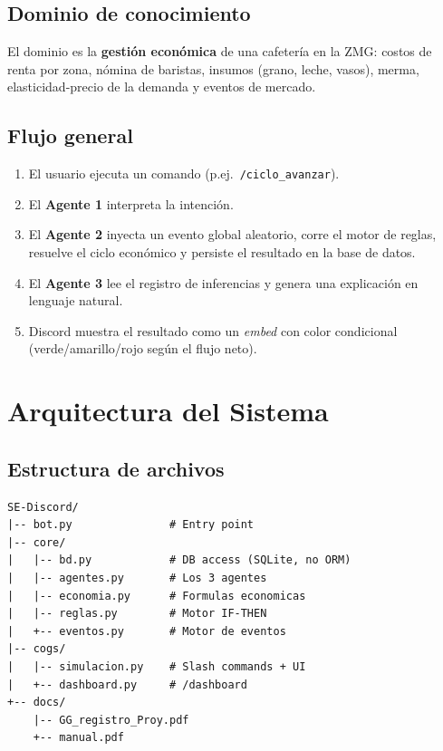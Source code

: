 \documentclass[12pt,spanish]{article}
\begin{document}
\subsection*{Dominio de conocimiento}

El dominio es la \textbf{gestión económica} de una cafetería en la ZMG:
costos de renta por zona, nómina de baristas, insumos (grano, leche,
vasos), merma, elasticidad-precio de la demanda y eventos de mercado.

\subsection*{Flujo general}

\begin{enumerate}
  \item El usuario ejecuta un comando (p.ej.\ \texttt{/ciclo\_avanzar}).
  \item El \textbf{Agente 1} interpreta la intención.
  \item El \textbf{Agente 2} inyecta un evento global aleatorio, corre el
        motor de reglas, resuelve el ciclo económico y persiste el
        resultado en la base de datos.
  \item El \textbf{Agente 3} lee el registro de inferencias y genera una
        explicación en lenguaje natural.
  \item Discord muestra el resultado como un \emph{embed} con color
        condicional (verde/amarillo/rojo según el flujo neto).
\end{enumerate}

\section{Arquitectura del Sistema}

\subsection*{Estructura de archivos}

\begin{lstlisting}[style=python, language={}]
SE-Discord/
|-- bot.py               # Entry point
|-- core/
|   |-- bd.py            # DB access (SQLite, no ORM)
|   |-- agentes.py       # Los 3 agentes
|   |-- economia.py      # Formulas economicas
|   |-- reglas.py        # Motor IF-THEN
|   +-- eventos.py       # Motor de eventos
|-- cogs/
|   |-- simulacion.py    # Slash commands + UI
|   +-- dashboard.py     # /dashboard
+-- docs/
    |-- GG_registro_Proy.pdf
    +-- manual.pdf
\end{lstlisting}
\end{document}
